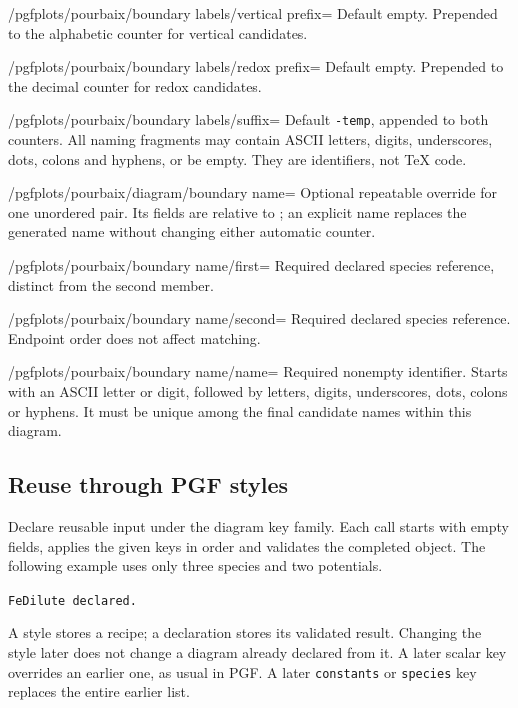\documentclass[a4paper,11pt]{ltxdoc}
\begin{document}
\begin{key}{/pgfplots/pourbaix/boundary labels/vertical prefix=}
Default empty. Prepended to the alphabetic counter for vertical candidates.
\end{key}
\begin{key}{/pgfplots/pourbaix/boundary labels/redox prefix=}
Default empty. Prepended to the decimal counter for redox candidates.
\end{key}
\begin{key}{/pgfplots/pourbaix/boundary labels/suffix=}
Default \texttt{-temp}, appended to both counters. All naming fragments may
contain ASCII letters, digits, underscores, dots, colons and hyphens, or be empty.
They are identifiers, not TeX code.
\end{key}
\begin{key}{/pgfplots/pourbaix/diagram/boundary name=}
Optional repeatable override for one unordered pair. Its fields are relative to
; an explicit name replaces the generated
name without changing either automatic counter.
\end{key}
\begin{key}{/pgfplots/pourbaix/boundary name/first=}
Required declared species reference, distinct from the second member.
\end{key}
\begin{key}{/pgfplots/pourbaix/boundary name/second=}
Required declared species reference. Endpoint order does not affect matching.
\end{key}
\begin{key}{/pgfplots/pourbaix/boundary name/name=}
Required nonempty identifier. Starts with an ASCII letter or digit, followed by
letters, digits, underscores, dots, colons or hyphens. It must be unique among
the final candidate names within this diagram.
\end{key}

\subsection{Reuse through PGF styles}
Declare reusable input under the diagram key family. Each call starts with empty
fields, applies the given keys in order and validates the completed object.
The following example uses only three species and two potentials.
\begin{codeexample}[width=3.2cm]
\texttt{FeDilute declared.}
\end{codeexample}
A style stores a recipe; a declaration stores its validated result. Changing the
style later does not change a diagram already declared from it. A later scalar
key overrides an earlier one, as usual in PGF. A later \texttt{constants} or
\texttt{species} key replaces the entire earlier list.
\end{document}
